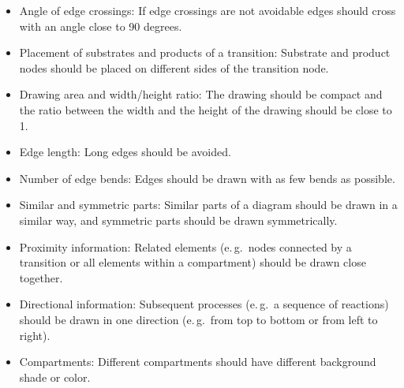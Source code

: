 \begin{itemize}
  \item Angle of edge crossings: If edge crossings are not avoidable
  edges should cross with an angle close to 90 degrees.
  \item Placement of substrates and products of a transition:
  Substrate and product nodes should be placed
  on different sides of the transition node.
  \item Drawing area and width/height ratio: The drawing should
  be compact and the ratio between the width and the height
  of the drawing should be close to 1.
  \item Edge length: Long edges should be avoided.
  \item Number of edge bends: Edges should be drawn with
  as few bends as possible.
  \item Similar and symmetric parts: Similar parts of a diagram
  should be drawn in a similar way, and symmetric parts
  should be drawn symmetrically.
  \item Proximity information: Related elements (e.\,g.~nodes
  connected by a transition or all elements within a compartment)
  should be drawn close together.
  \item Directional information: Subsequent processes (e.\,g.~a sequence
  of reactions) should be drawn in one direction (e.\,g.~from
  top to bottom or from left to right).
  \item Compartments: Different compartments should have different
  background shade or color.
\end{itemize}
